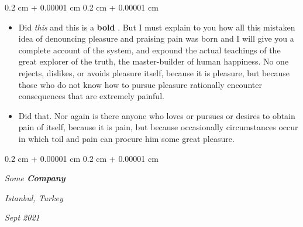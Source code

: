 \documentclass[10pt, letterpaper]{article}
\newenvironment{highlights}{
    \begin{itemize}[
        topsep=0.10 cm,
        parsep=0.10 cm,
        partopsep=0pt,
        itemsep=0pt,
        leftmargin=0.4 cm + 10pt
    ]
}{
    \end{itemize}
} %
\newenvironment{onecolentry}{
    \begin{adjustwidth}{
        0.2 cm + 0.00001 cm
    }{
        0.2 cm + 0.00001 cm
    }
}{
    \end{adjustwidth}
} %
\newenvironment{twocolentry}[2][]{
    \onecolentry
    \def\secondColumn{#2}
    \setcolumnwidth{\fill, 4.5 cm}
    \begin{paracol}{2}
}{
    \switchcolumn \raggedleft \secondColumn
    \end{paracol}
    \endonecolentry
} %
\let\hrefWithoutArrow\href
\renewcommand{\href}[2]{\hrefWithoutArrow{#1}{\ifthenelse{\equal{#2}{}}{ }{#2 }\raisebox{.15ex}{\footnotesize \faExternalLink*}}}
\begin{document}
        \vspace{0.10 cm}
        \begin{onecolentry}
            \begin{highlights}
                \item Did \textit{this} and this is a \textbf{bold} \href{https://example.com}{link}. But I must explain to you how all this mistaken idea of denouncing pleasure and praising pain was born and I will give you a complete account of the system, and expound the actual teachings of the great explorer of the truth, the master-builder of human happiness. No one rejects, dislikes, or avoids pleasure itself, because it is pleasure, but because those who do not know how to pursue pleasure rationally encounter consequences that are extremely painful.
                \item Did that. Nor again is there anyone who loves or pursues or desires to obtain pain of itself, because it is pain, but because occasionally circumstances occur in which toil and pain can procure him some great pleasure.
            \end{highlights}
        \end{onecolentry}


        \vspace{0.2 cm}

            \begin{twocolentry}{
        \textit{Istanbul, Turkey}

        \textit{Sept 2021}    }
                \textbf{}

                \textit{Some \textbf{Company}}
            \end{twocolentry}
\end{document}
